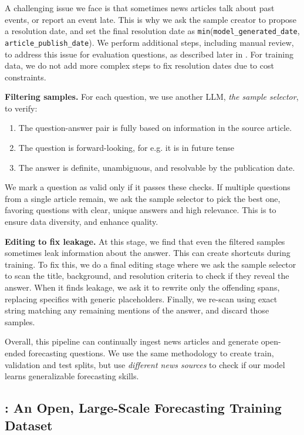  A challenging issue we face is that sometimes news articles talk about past events, or report an event late. This is why we ask the sample creator to propose a resolution date, and set the final resolution date as \texttt{min}\big(\texttt{model\_generated\_date}, \texttt{article\_publish\_date}\big). We perform additional steps, including manual review, to address this issue for evaluation questions, as described later in . For training data, we do not add more complex steps to fix resolution dates due to cost constraints. \vspace{0.15cm}

 \textbf{Filtering samples.} For each question, we use another LLM, \textit{the sample selector}, to verify:
\begin{enumerate}
    \item The question-answer pair is fully based on information in the source article.
    \item The question is forward-looking, for e.g. it is in future tense
    \item The answer is definite, unambiguous, and resolvable by the publication date.
\end{enumerate}
We mark a question as valid only if it passes these checks. If multiple questions from a single article remain, we ask the sample selector to pick the best one, favoring questions with clear, unique answers and high relevance. This is to ensure data diversity, and enhance quality. \vspace{0.15cm}

 \textbf{Editing to fix leakage.} At this stage, we find that even the filtered samples sometimes leak information about the answer. This can create shortcuts during training. To fix this, we do a final editing stage where we ask the sample selector to scan the title, background, and resolution criteria to check if they reveal the answer. When it finds leakage, we ask it to rewrite only the offending spans, replacing specifics with generic placeholders. Finally, we re-scan using exact string matching any remaining mentions of the answer, and discard those samples.

Overall, this pipeline can continually ingest news articles and generate open-ended forecasting questions. We use the same methodology to create train, validation and test splits, but use \textit{different news sources} to check if our model learns generalizable forecasting skills. 

\subsection{\ourdataset: An Open, Large-Scale Forecasting Training Dataset}

